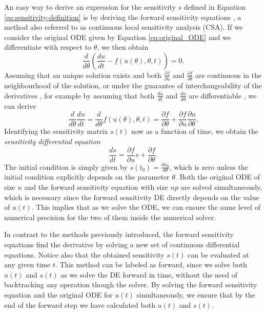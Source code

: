 An easy way to derive an expression for the sensitivity $s$ defined in Equation \eqref{eq:sensitivity-definition} is by deriving the forward sensitivity equations \cite{ramsay2017dynamic}, a method also referred to as continuous local sensitivity analysis (CSA). 
If we consider the original ODE given by Equation \eqref{eq:original_ODE} and we differentiate with respect to $\theta$, we then obtain
\begin{equation}
    \frac{d}{d\theta} \left( \frac{du}{dt}  - f(u(\theta), \theta, t) \right) = 0.
\end{equation}
Assuming that an unique solution exists and both $\frac{\partial f}{\partial u}$ and $\frac{\partial f}{\partial \theta}$ are continuous in the neighbourhood of the solution, or under the guarantee of interchangeability of the derivatives \cite{gronwall1919note}, for example by assuming that both $\frac{du}{dt}$ and $\frac{du}{d\theta}$ are differentiable \cite{math8111947}, we can derive
\begin{equation}
 \frac{d}{d\theta} \frac{du}{dt} 
 =
 \frac{d}{d\theta} f(u(\theta), \theta, t)
 = 
 \frac{\partial f}{\partial \theta}
 + 
 \frac{\partial f}{\partial u} \frac{\partial u}{\partial \theta}.
\end{equation}
Identifying the sensitivity matrix $s(t)$ now as a function of time, we obtain the \textit{sensitivity differential equation} 
\begin{equation}
 \frac{ds}{dt} = \frac{\partial f}{\partial u} s + \frac{\partial f}{\partial \theta}.
 \label{eq:sensitivity_equations}
\end{equation}
The initial condition is simply given by $s(t_0) = \frac{du_0}{d\theta}$, which is zero unless the initial condition explicitly depends on the parameter $\theta$.
Both the original ODE of size $n$ and the forward sensitivity equation with size $np$ are solved simultaneously, which is necessary since the forward sensitivity DE directly depends on the value of $u(t)$.  
This implies that as we solve the ODE, we can ensure the same level of numerical precision for the two of them inside the numerical solver.

In contrast to the methods previously introduced, the forward sensitivity equations find the derivative by solving a new set of continuous differential equations.
Notice also that the obtained sensitivity $s(t)$ can be evaluated at any given time $t$. 
This method can be labeled as forward, since we solve both $u(t)$ and $s(t)$ as we solve the DE forward in time, without the need of backtracking any operation though the solver.
By solving the forward sensitivity equation and the original ODE for $u(t)$ simultaneously, we ensure that by the end of the forward step we have calculated both $u(t)$ and $s(t)$. 